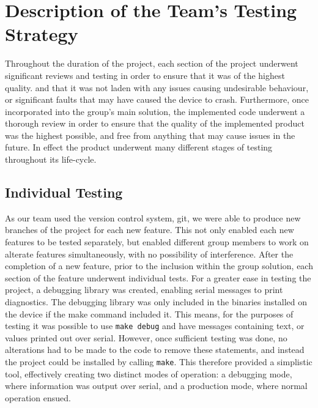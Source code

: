 \section{Description of the Team's Testing Strategy}

Throughout the duration of the project, each section of the project underwent 
significant reviews and testing in order to ensure that it was of the highest 
quality.
and that it was not laden with any issues causing undesirable behaviour, 
or significant faults that may have caused the device to crash. Furthermore, once 
incorporated into the group's main solution, the implemented code underwent a 
thorough review in order to ensure that the quality of the implemented product 
was the highest possible, and free from anything that may cause issues in the 
future. In effect the product underwent many different stages of testing 
throughout its life-cycle. 

\subsection*{Individual Testing}

As our team used the version control system, git, we were able to produce new 
branches of the project for each new feature. 
This not only enabled each new features to be tested separately, but enabled 
different group members to work on alterate features simultaneously, with no 
possibility of interference. 
After the completion of a new feature, prior to the inclusion within the group 
solution, each section of the feature underwent individual tests. 
For a greater ease in testing the project,  a debugging library was created, 
enabling serial messages to print diagnostics. 
The debugging library was only included in the 
binaries installed on the device if the make command included it. This 
means, for the purposes of testing it was possible to use \texttt{make debug} 
and have messages containing text, or values printed out over serial. 
However, once sufficient testing was done, no 
alterations had to be made to the code to remove these statements, and 
instead the project could be installed by calling \texttt{make}. 
This therefore provided a simplistic tool, effectively creating two distinct 
modes of operation: a debugging mode, where information was output over serial, 
and a production mode, where normal operation ensued. 


